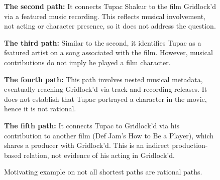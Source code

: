 \begin{figure}[t]
\begin{tcolorbox}[colback=gray!5!white,
                  colframe=gray!75!black,
                  title=WebQTest-415\_b6ad66a3f1f515d0688c346e16d202e6]
{\textbf{The second path:} It connects Tupac Shakur to the film Gridlock'd via a featured music recording. This reflects musical involvement, not acting or character presence, so it does not address the question.\par\vspace{6pt}

\textbf{The third path:} Similar to the second, it identifies Tupac as a featured artist on a song associated with the film. However, musical contributions do not imply he played a film character.\par\vspace{6pt}

\textbf{The fourth path:} This path involves nested musical metadata, eventually reaching Gridlock'd via track and recording releases. It does not establish that Tupac portrayed a character in the movie, hence it is not rational.\par\vspace{6pt}

\textbf{The fifth path:} It connects Tupac to Gridlock'd via his contribution to another film (Def Jam's How to Be a Player), which shares a producer with Gridlock'd. This is an indirect production-based relation, not evidence of his acting in Gridlock'd.\par}
\end{tcolorbox}
\caption{Motivating example on not all shortest paths are rational paths.}
\label{fig:type1_no2}
\end{figure}

